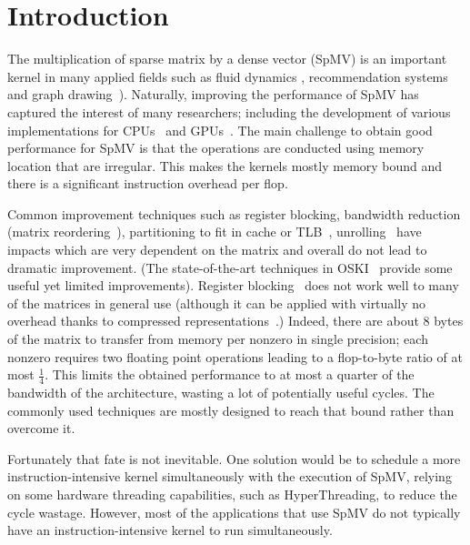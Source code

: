 \documentclass[10pt,conference,compsocconf]{IEEEtran}
\begin{document}
\IEEEpeerreviewmaketitle

\section{Introduction}
The multiplication of sparse matrix by a dense vector (SpMV) is an
important kernel in many applied fields such as fluid dynamics 
\cite{journals/tog/BolzFGS03}, recommendation systems~\cite{Brin98} and graph
drawing~\cite{Koren05}). Naturally, improving the performance of SpMV has
captured the interest of many researchers; including the development of
various implementations for 
CPUs~\cite{Buluc2009SPAA,Williams07} and GPUs~\cite{Bell08,
  conf/ipps/KreutzerHWFBB12,
  journals/concurrency/VazquezFG11,kumar2012accelerating}. The main
challenge  to obtain good performance for SpMV is that
the operations are conducted using memory location that are irregular. This makes the kernels mostly memory
bound and there is a significant instruction overhead per flop.

Common improvement techniques such as register blocking, bandwidth
reduction (matrix reordering~\cite{Cuthill69}), partitioning to fit in
cache or TLB~\cite{Nishtala07,Temam:1992:CBS:147877.148091,conf/ppsc/Toledo97},
unrolling~\cite{Mellor-Crummey04} have impacts which are very
dependent on the matrix and overall do not lead to dramatic
improvement. (The state-of-the-art techniques in OSKI~\cite{Vuduc05}
provide some useful yet limited improvements). Register blocking~\cite{conf/ppsc/Toledo97} does
not work well to many of the matrices in general use (although it can be applied
with virtually no overhead thanks to compressed
representations~\cite{Buluc11}.) Indeed, there are about 8 bytes of the matrix to transfer
from memory 
per nonzero in single precision; each nonzero requires two
floating point operations leading to a flop-to-byte ratio of at most
$\frac{1}{4}$. This limits the obtained performance to at most a
quarter of the bandwidth of the architecture, wasting a lot of
potentially useful cycles. The commonly used techniques are mostly
designed to reach that bound rather than overcome it.

Fortunately that fate is not inevitable. One solution would be to
schedule a more instruction-intensive kernel simultaneously with the
execution of SpMV, relying on some hardware threading capabilities,
such as HyperThreading, to reduce the cycle wastage. However, most of 
the applications that use SpMV do not typically have an 
instruction-intensive kernel to run simultaneously.
\end{document}
